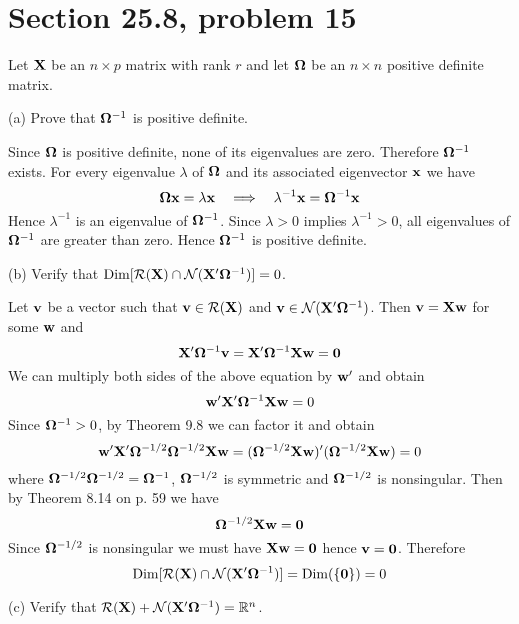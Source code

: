 \section{Section 25.8, problem 15}
Let $\bf X$ be an $n\times p$ matrix with rank $r$ and let
$\bf\Omega$ be an $n\times n$ positive definite matrix.

\bigskip
\noindent
(a) Prove that ${\bf\Omega}^{-1}$ is positive definite.

\bigskip
\noindent
Since $\bf\Omega$ is positive definite,
none of its eigenvalues are zero.
Therefore ${\bf\Omega}^{-1}$ exists.
For every eigenvalue $\lambda$ of $\bf\Omega$ and its associated eigenvector $\bf x$
we have
$${\bf\Omega}{\bf x}=\lambda{\bf x}
\quad\Longrightarrow\quad
\lambda^{-1}{\bf x}={\bf\Omega}^{-1}{\bf x}
$$
Hence $\lambda^{-1}$ is an eigenvalue of ${\bf\Omega}^{-1}$.
Since $\lambda>0$ implies $\lambda^{-1}>0$, all eigenvalues
of ${\bf\Omega}^{-1}$ are greater than zero.
Hence ${\bf\Omega}^{-1}$ is positive definite.

\bigskip
\noindent
(b) Verify that
$\mathop{\rm Dim}[{\cal R}({\bf X})\cap
{\cal N}({\bf X}'{\bf\Omega}^{-1})]=0$.

\bigskip
\noindent
Let $\bf v$ be a vector such that ${\bf v}\in{\cal R}({\bf X})$ and
${\bf v}\in{\cal N}({\bf X}'{\bf\Omega}^{-1})$.
Then ${\bf v}={\bf Xw}$ for some $\bf w$
and
$${\bf X}'{\bf\Omega}^{-1}{\bf v}
={\bf X}'{\bf\Omega}^{-1}{\bf Xw}={\bf 0}$$
We can multiply both sides of the above equation by ${\bf w}'$
and obtain
$${\bf w}'{\bf X}'{\bf\Omega}^{-1}{\bf Xw}=0$$
Since ${\bf\Omega}^{-1}>0$, by Theorem 9.8 we can factor it and
obtain
$${\bf w}'{\bf X}'{\bf\Omega}^{-1/2}{\bf\Omega}^{-1/2}{\bf Xw}
=({\bf\Omega}^{-1/2}{\bf Xw})'({\bf\Omega}^{-1/2}{\bf Xw)}=0$$
where ${\bf\Omega}^{-1/2}{\bf\Omega}^{-1/2}={\bf\Omega}^{-1}$,
${\bf\Omega}^{-1/2}$ is symmetric and ${\bf\Omega}^{-1/2}$ is
nonsingular.
Then by Theorem 8.14 on p. 59 we have
$${\bf\Omega}^{-1/2}{\bf Xw}=\bf0$$
Since ${\bf\Omega}^{-1/2}$ is nonsingular
we must have ${\bf Xw}={\bf 0}$ hence ${\bf v}=\bf0$.
Therefore
$$\mathop{\rm Dim}[{\cal R}({\bf X})\cap
{\cal N}({\bf X}'{\bf\Omega}^{-1})]=\mathop{\rm Dim}(\{{\bf0}\})=0$$

\bigskip
\noindent
(c) Verify that
${\cal R}({\bf X})+{\cal N}({\bf X}'{\bf\Omega}^{-1})=\mathbb{R}^n$.

